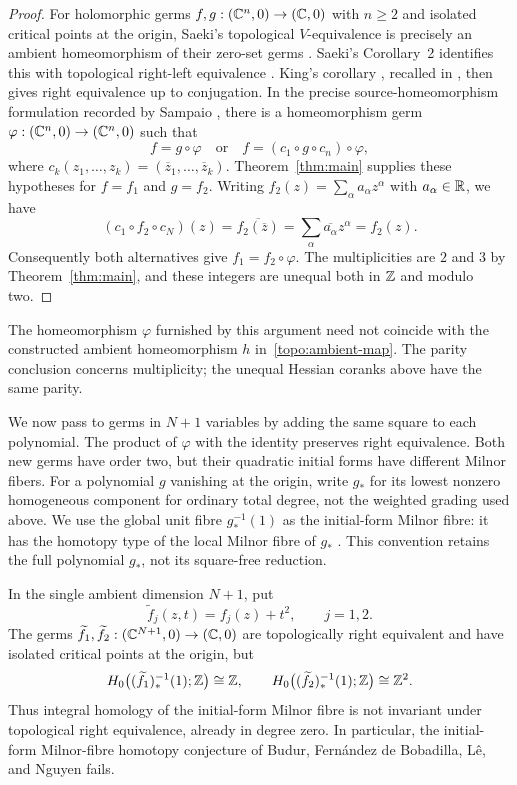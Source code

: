 \begin{proof}
For holomorphic germs $f,g:(\mathbb C^n,0)\to(\mathbb C,0)$ with $n\ge2$ and isolated
critical points at the origin, Saeki's topological $V$-equivalence is
precisely an ambient homeomorphism of their zero-set germs
\cite[Definition~3]{Saeki1989}. Saeki's Corollary~2 identifies this with
topological right-left equivalence \cite{Saeki1989}. King's corollary
\cite{King1978}, recalled in \cite[Section~3, p.~28]{Saeki1989}, then
gives right equivalence up to conjugation. In the precise
source-homeomorphism formulation recorded by Sampaio
\cite[proof of Proposition~2.4]{Sampaio2025Milnor}, there is a homeomorphism germ
$\varphi:(\mathbb C^n,0)\to(\mathbb C^n,0)$ such that
\[
 f=g\circ\varphi
 \quad\text{or}\quad
 f=(c_1\circ g\circ c_n)\circ\varphi,
\]
where $c_k(z_1,\ldots,z_k)=(\overline z_1,\ldots,\overline z_k)$.
Theorem~\ref{thm:main} supplies these hypotheses for $f=f_1$ and $g=f_2$.
Writing $f_2(z)=\sum_\alpha a_\alpha z^\alpha$ with $a_\alpha\in\mathbb R$, we have
\[
 (c_1\circ f_2\circ c_N)(z)
   =\overline{f_2(\overline z)}
   =\sum_\alpha\overline{a_\alpha}z^\alpha
   =f_2(z).
\]
Consequently both alternatives give $f_1=f_2\circ\varphi$.
The multiplicities are $2$ and $3$ by Theorem~\ref{thm:main}, and these
integers are unequal both in $\mathbb Z$ and modulo two.
\end{proof}

The homeomorphism $\varphi$ furnished by this argument need not coincide
with the constructed ambient homeomorphism $h$ in~\eqref{topo:ambient-map}.
The parity conclusion concerns multiplicity; the unequal Hessian coranks
above have the same parity.

We now pass to germs in $N+1$ variables by adding the same square to
each polynomial.  The product of $\varphi$ with the identity preserves
right equivalence.  Both new germs have order two, but their quadratic
initial forms have different Milnor fibers.
For a polynomial $g$ vanishing at the origin, write $g_*$ for its lowest
nonzero homogeneous component for ordinary total degree, not the weighted
grading used above. We use the global unit fibre $g_*^{-1}(1)$ as the
initial-form Milnor fibre: it has the homotopy type of the local Milnor
fibre of $g_*$ \cite[Proposition~1.6 in arXiv v3]{BudurEtAl2022ContactLoci}.
This convention retains the full polynomial $g_*$, not its square-free
reduction.

\begin{corollary}
\label{topo:tangent-milnor}
In the single ambient dimension $N+1$, put
\[
 \widetilde f_j(z,t)=f_j(z)+t^2,\qquad j=1,2.
\]
The germs $\widetilde f_1,\widetilde f_2:(\mathbb C^{N+1},0)\to(\mathbb C,0)$ are
topologically right equivalent and have isolated critical points at the
origin, but
\[
 H_0\bigl((\widetilde f_1)_*^{-1}(1);\mathbb Z\bigr)\cong\mathbb Z,
 \qquad
 H_0\bigl((\widetilde f_2)_*^{-1}(1);\mathbb Z\bigr)\cong\mathbb Z^2.
\]
Thus integral homology of the initial-form Milnor fibre is not invariant
under topological right equivalence, already in degree zero. In particular,
the initial-form Milnor-fibre homotopy conjecture of Budur, Fern\'andez de
Bobadilla, L\^e, and Nguyen
\cite[Conjecture~1.7 in arXiv v3]{BudurEtAl2022ContactLoci} fails.
\end{corollary}


